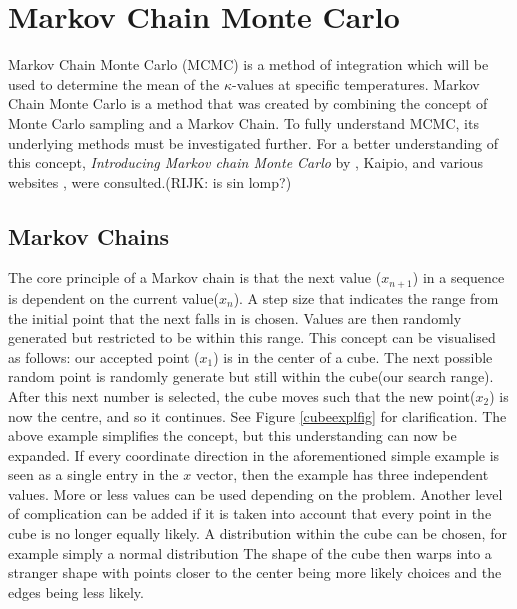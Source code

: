 	

\section{Markov Chain Monte Carlo} \label{MCMCdet}
Markov Chain Monte Carlo (MCMC) is a method of integration which will be used to determine the mean of the $\kappa$-values at specific temperatures. 
	Markov Chain Monte Carlo is a method that was created by combining the concept of Monte Carlo sampling  and a Markov Chain. 
	To fully understand MCMC, its underlying methods must be investigated further.
	For a better understanding of this concept, \textit{Introducing Markov chain Monte Carlo} by \citeauthor{Gilks:1996}, Kaipio, and various websites \cite{MLM:2019}, \cite{dummies:2015} were consulted.(RIJK: is sin lomp?)
	\subsection{Markov Chains}	\label{markovexpl}
	The core principle of a Markov chain is that the next value ($x_{n+1}$) in a sequence is dependent on the current value($x_n$). 
	A step size that indicates the range from the initial point that the next falls in is chosen. 
	Values are then randomly generated but restricted to be within this range.
	This concept can be visualised as follows: our accepted point ($x_1$) is in the center of a cube. The next possible random point is randomly generate but still within the cube(our search range). 	
	After this next number is selected, the cube moves such that the new point($x_2$) is now the centre, and so it continues.
	See Figure \ref{cubeexplfig} for clarification.
	The above example simplifies the concept, but this understanding can now be expanded.
	If every coordinate direction in the aforementioned simple example is seen as a single entry in the $x$ vector, then the example has three independent values.
	More or less values can be used depending on the problem.
	Another level of complication can be added if it is taken into account that every point in the cube is no longer equally likely.
	A distribution within the cube can be chosen, for example simply a normal distribution
	The shape of the cube then warps into a stranger shape with points closer to the center being more likely choices and the edges being less likely.

